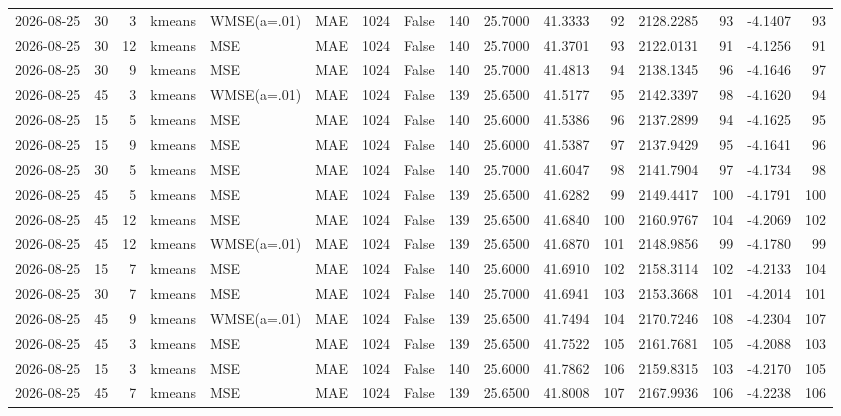 \documentclass[10pt]{article}
\begin{document}
\begin{landscape}
\begin{longtable}{@{}lrrlllrcrrrrrrrr@{}}
2026-08-25 & 30 & 3 & kmeans & WMSE(a=.01) & MAE & 1024 & False & 140 & 25.7000 & 41.3333 & 92 & 2128.2285 & 93 & -4.1407 & 93 \\
2026-08-25 & 30 & 12 & kmeans & MSE & MAE & 1024 & False & 140 & 25.7000 & 41.3701 & 93 & 2122.0131 & 91 & -4.1256 & 91 \\
2026-08-25 & 30 & 9 & kmeans & MSE & MAE & 1024 & False & 140 & 25.7000 & 41.4813 & 94 & 2138.1345 & 96 & -4.1646 & 97 \\
2026-08-25 & 45 & 3 & kmeans & WMSE(a=.01) & MAE & 1024 & False & 139 & 25.6500 & 41.5177 & 95 & 2142.3397 & 98 & -4.1620 & 94 \\
2026-08-25 & 15 & 5 & kmeans & MSE & MAE & 1024 & False & 140 & 25.6000 & 41.5386 & 96 & 2137.2899 & 94 & -4.1625 & 95 \\
2026-08-25 & 15 & 9 & kmeans & MSE & MAE & 1024 & False & 140 & 25.6000 & 41.5387 & 97 & 2137.9429 & 95 & -4.1641 & 96 \\
2026-08-25 & 30 & 5 & kmeans & MSE & MAE & 1024 & False & 140 & 25.7000 & 41.6047 & 98 & 2141.7904 & 97 & -4.1734 & 98 \\
2026-08-25 & 45 & 5 & kmeans & MSE & MAE & 1024 & False & 139 & 25.6500 & 41.6282 & 99 & 2149.4417 & 100 & -4.1791 & 100 \\
2026-08-25 & 45 & 12 & kmeans & MSE & MAE & 1024 & False & 139 & 25.6500 & 41.6840 & 100 & 2160.9767 & 104 & -4.2069 & 102 \\
2026-08-25 & 45 & 12 & kmeans & WMSE(a=.01) & MAE & 1024 & False & 139 & 25.6500 & 41.6870 & 101 & 2148.9856 & 99 & -4.1780 & 99 \\
2026-08-25 & 15 & 7 & kmeans & MSE & MAE & 1024 & False & 140 & 25.6000 & 41.6910 & 102 & 2158.3114 & 102 & -4.2133 & 104 \\
2026-08-25 & 30 & 7 & kmeans & MSE & MAE & 1024 & False & 140 & 25.7000 & 41.6941 & 103 & 2153.3668 & 101 & -4.2014 & 101 \\
2026-08-25 & 45 & 9 & kmeans & WMSE(a=.01) & MAE & 1024 & False & 139 & 25.6500 & 41.7494 & 104 & 2170.7246 & 108 & -4.2304 & 107 \\
2026-08-25 & 45 & 3 & kmeans & MSE & MAE & 1024 & False & 139 & 25.6500 & 41.7522 & 105 & 2161.7681 & 105 & -4.2088 & 103 \\
2026-08-25 & 15 & 3 & kmeans & MSE & MAE & 1024 & False & 140 & 25.6000 & 41.7862 & 106 & 2159.8315 & 103 & -4.2170 & 105 \\
2026-08-25 & 45 & 7 & kmeans & MSE & MAE & 1024 & False & 139 & 25.6500 & 41.8008 & 107 & 2167.9936 & 106 & -4.2238 & 106 \\

\end{longtable}
\end{landscape}
\end{document}
